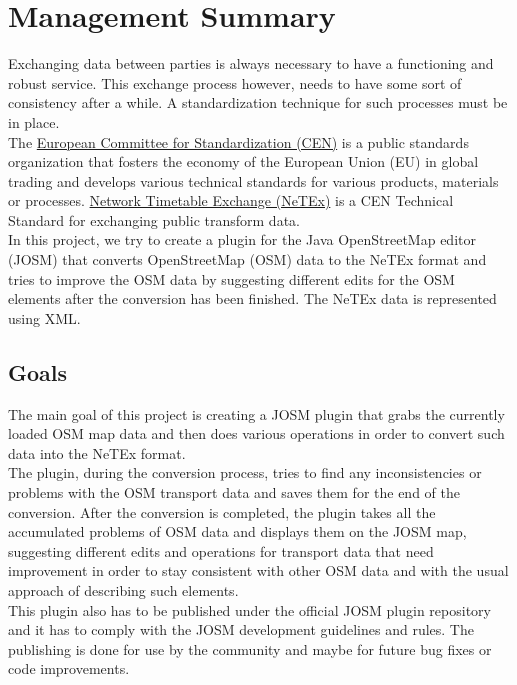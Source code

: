 \chapter*{Management Summary}
Exchanging data between parties is always necessary to have a functioning and robust service. This exchange process however, needs to have some sort of consistency after a while. A standardization technique for such processes must be in place.\\
\newline
The \href{https://en.wikipedia.org/wiki/European_Committee_for_Standardization}{European Committee for Standardization (CEN)} is a public standards organization that fosters the economy of the European Union (EU) in global trading and develops various technical standards for various products, materials or processes. \href{http://netex-cen.eu/}{Network Timetable Exchange (NeTEx)} is a CEN Technical Standard for exchanging public transform data. \\
\newline
In this project, we try to create a plugin for the Java OpenStreetMap editor (JOSM) that converts OpenStreetMap (OSM) data to the NeTEx format and tries to improve the OSM data by suggesting different edits for the OSM elements after the conversion has been finished. The NeTEx data is represented using XML.
\section*{Goals}
The main goal of this project is creating a JOSM plugin that grabs the currently loaded OSM map data and then does various operations in order to convert such data into the NeTEx format.\\
The plugin, during the conversion process, tries to find any inconsistencies or problems with the OSM transport data and saves them for the end of the conversion. After the conversion is completed, the plugin takes all the accumulated problems of OSM data and displays them on the JOSM map, suggesting different edits and operations for transport data that need improvement in order to stay consistent with other OSM data and with the usual approach of describing such elements.\\
This plugin also has to be published under the official JOSM plugin repository and it has to comply with the JOSM development guidelines and rules. The publishing is done for use by the community and maybe for future bug fixes or code improvements.
